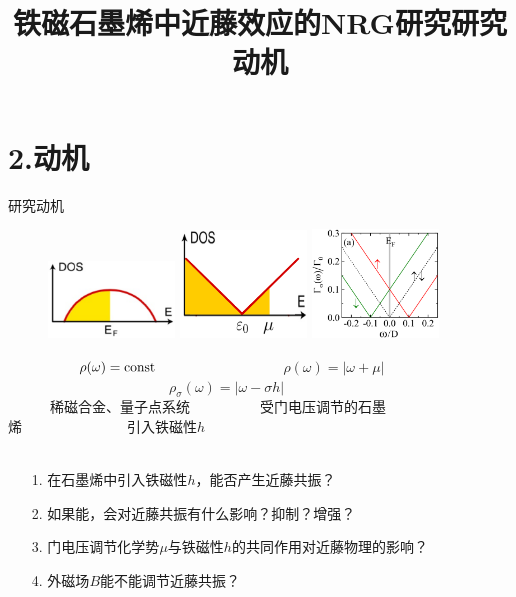 \documentclass[9pt,t]{beamer} %
\begin{document}
\section{2.动机}
\title{铁磁石墨烯中近藤效应的NRG研究\qquad \qquad \qquad \qquad 研究动机}
\begin{frame}{研究动机}
\begin{figure}
\includegraphics[width=0.3\textwidth,height=0.25\textwidth]{metal-dos.png}
\includegraphics[width=0.3\textwidth,height=0.25\textwidth]{gated-dos.png}
\includegraphics[width=0.3\textwidth,height=0.25\textwidth]{hyb1.png}
\end{figure}
~~~~~~~~~~$\rho(\omega)=\rm{const}$~~~~~~~~~~~~~~~~~~$\rho(\omega)=|\omega+\mu|$~~~~~~~~~~~~~~~~~~~~~~~$\rho_{\sigma}(\omega)=|\omega-\sigma h|$\\
~~~~~~稀磁合金、量子点系统~~~~~~~~~~受门电压调节的石墨烯~~~~~~~~~~~~~~~引入铁磁性$h$\\ \ \\
\begin{itemize}
\setlength\itemsep{0.4em}
\item[1.] 在石墨烯中引入铁磁性$h$，能否产生近藤共振？
\item[2.] 如果能，会对近藤共振有什么影响？抑制？增强？
\item[3.] 门电压调节化学势$\mu$与铁磁性$h$的共同作用对近藤物理的影响？
\item[4.] 外磁场$B$能不能调节近藤共振？
\end{itemize}
\end{frame}
\end{document}
